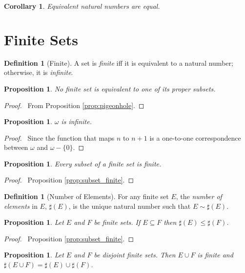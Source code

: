 \documentclass{report}
\let\qed\relax
\newtheorem{prop}[ax]{Proposition}
\newtheorem{cor}{Corollary}[ax]
\theoremstyle{definition}
\newtheorem{df}[ax]{Definition}
\begin{document}
\begin{cor}
Equivalent natural numbers are equal.
\end{cor}

\section{Finite Sets}

\begin{df}[Finite]
A set is \emph{finite} iff it is equivalent to a natural number; otherwise, it is \emph{infinite}.
\end{df}

\begin{prop}
No finite set is equivalent to one of its proper subsets.
\end{prop}

\begin{proof}
\pf\ From Proposition \ref{prop:pigeonhole}. \qed
\end{proof}

\begin{prop}
$\omega$ is infinite.
\end{prop}

\begin{proof}
\pf\ Since the function that maps $n$ to $n+1$ is a one-to-one correspondence between $\omega$ and $\omega - \{0\}$. \qed
\end{proof}

\begin{prop}
Every subset of a finite set is finite.
\end{prop}

\begin{proof}
\pf\ Proposition \ref{prop:subset_finite}. \qed
\end{proof}

\begin{df}[Number of Elements]
For any finite set $E$, the \emph{number of elements} in $E$, $\sharp(E)$, is the unique natural number such that $E \sim \sharp(E)$.
\end{df}

\begin{prop}
Let $E$ and $F$ be finite sets. If $E \subseteq F$ then $\sharp(E) \leq \sharp(F)$.
\end{prop}

\begin{proof}
\pf\ Proposition \ref{prop:subset_finite}. \qed
\end{proof}

\begin{prop}
\label{prop:size_of_union}
Let $E$ and $F$ be disjoint finite sets. Then $E \cup F$ is finite and $\sharp(E \cup F) = \sharp(E) \cup \sharp(F)$.
\end{prop}
\end{document}
